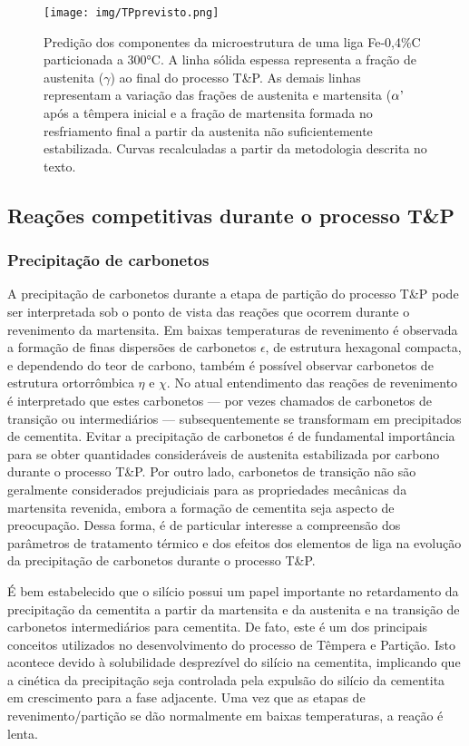 \begin{figure}
	\texttt{[image: img/TPprevisto.png]}
	\caption{Predição dos componentes da microestrutura de uma liga Fe-0,4\%C particionada a 300°C. A linha sólida espessa representa a fração de austenita ($\gamma$) ao final do processo T\&P. As demais linhas representam a variação das frações de austenita e martensita ($\alpha\text{\textquoteright}$ após a têmpera inicial e a fração de martensita formada no resfriamento final a partir da austenita não suficientemente estabilizada. Curvas recalculadas a partir da metodologia descrita no texto.}
	\label{fig:TPprevisto}
\end{figure}

\subsection{Rea\c{c}\~{o}es competitivas durante o processo T\&P}

\subsubsection{Precipitação de carbonetos}

A precipitação de carbonetos durante a etapa de partição do processo T\&P pode ser interpretada sob o ponto de vista das reações que ocorrem durante o revenimento da martensita. Em baixas temperaturas de revenimento é observada a formação de finas dispersões de carbonetos $\epsilon$, de estrutura hexagonal compacta, e dependendo do teor de carbono, também é possível observar carbonetos de estrutura ortorrômbica $\eta$ e $\chi$. No atual entendimento das reações de revenimento é interpretado que estes carbonetos --- por vezes chamados de carbonetos de transição ou intermediários --- subsequentemente se transformam em precipitados de cementita\cite{Speich1972}. Evitar a precipitação de carbonetos é de fundamental importância para se obter quantidades consideráveis de austenita estabilizada por carbono durante o processo T\&P. Por outro lado, carbonetos de transição não são geralmente considerados prejudiciais para as propriedades mecânicas da martensita revenida, embora a formação de cementita seja aspecto de preocupação\cite{Krauss1983}. Dessa forma, é de particular interesse a compreensão dos parâmetros de tratamento térmico e dos efeitos dos elementos de liga na evolução da precipitação de carbonetos durante o processo T\&P. 

É bem estabelecido que o silício possui um papel importante no retardamento da precipitação da cementita a partir da martensita e da austenita e na transição de carbonetos intermediários para cementita. De fato, este é um dos principais conceitos utilizados no desenvolvimento do processo de Têmpera e Partição. Isto acontece devido à solubilidade desprezível do silício na cementita\cite{Owen1951,Barnard1981a}, implicando que a cinética da precipitação seja controlada pela expulsão do silício da cementita em crescimento para a fase adjacente. Uma vez que as etapas de revenimento/partição se dão normalmente em baixas temperaturas, a reação é lenta.

